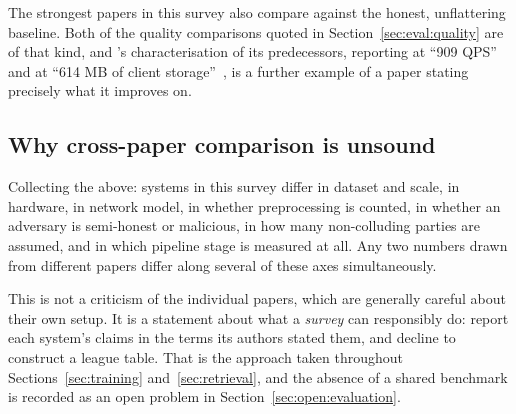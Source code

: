The strongest papers in this survey also compare against the honest, unflattering baseline. Both
of the quality comparisons quoted in Section~\ref{sec:eval:quality} are of that kind, and
\wallyplain{}'s characterisation of its predecessors, reporting \tiptoeplain{} at ``909 QPS''
and \pacmannplain{} at ``614 MB of client storage''~\cite{wally2024}, is a further example of a
paper stating precisely what it improves on.

\subsection{Why cross-paper comparison is unsound}
\label{sec:eval:comparison}

Collecting the above: systems in this survey differ in dataset and scale, in hardware, in network
model, in whether preprocessing is counted, in whether an adversary is semi-honest or malicious,
in how many non-colluding parties are assumed, and in which pipeline stage is measured at all.
Any two numbers drawn from different papers differ along several of these axes simultaneously.

This is not a criticism of the individual papers, which are generally careful about their own
setup. It is a statement about what a \emph{survey} can responsibly do: report each system's
claims in the terms its authors stated them, and decline to construct a league table. That is the
approach taken throughout Sections~\ref{sec:training} and~\ref{sec:retrieval}, and the absence of
a shared benchmark is recorded as an open problem in Section~\ref{sec:open:evaluation}.

